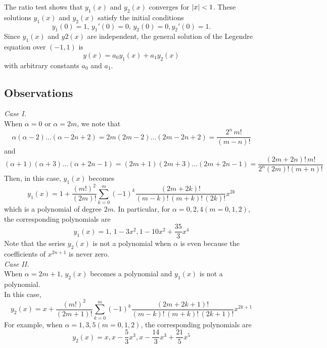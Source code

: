 \documentclass[../main-sheet.tex]{subfiles}
\begin{document}
\begin{note}
    The ratio test shows that $ y_1(x ) $ and $ y_2(x ) $ converges for $ \left\vert x\right\vert < 1 $. These solutions $ y_1(x ) $ and $ y_2(x ) $ satisfy the initial conditions
    \[
        y_1(0) = 1,\, y_1' (0) = 0, \,y_2(0) = 0, y_2' (0) = 1.
        \]
    Since $ y_1(x ) $ and $  y2(x ) $ are independent, the general solution of the Legendre equation over $ (-1, 1) $ is
    \[
        y (x ) = a_0y_1(x ) + a_1y_2(x ) 
    \]
    with arbitrary constants $ a_0 $ and $ a_1 $.
\end{note}
\subsection{Observations}
    \emph{Case I.}\\
    When $ \alpha = 0 $ or $ \alpha = 2m $, we note that
    \[
        \alpha(\alpha - 2)\dots(\alpha - 2n + 2) = 2m(2m - 2)\dots(2m - 2n + 2) = \frac{2^n\,m!}{(m - n)!}
    \]
    and
    \[
        (\alpha + 1)(\alpha + 3)\dots(\alpha + 2n - 1)   =   (2m + 1)(2m + 3)\dots(2m + 2n - 1)=\frac{(2m + 2n)!\,m!}{2^n (2m)!(m + n)!}
    \]
    Then, in this case, $ y_1(x ) $ becomes
    \[
        y_1(x ) = 1 +\frac{(m!)^2}{(2m)!}\sum_{k=0}^m (-1)^k\frac{(2m+2k)!}{(m-k)!\,(m+k)!\,(2k)!}x^{2k}
    \]
    which is a polynomial of degree $ 2m $. In particular, for $ \alpha = 0, 2, 4(m = 0, 1, 2) $, the corresponding polynomials are
    \[
        y_1 (x ) = 1,\,  1 - 3x^2  ,  1 - 10x^2+\frac{35}{3}x^4
    \]
    Note that the series $ y_2(x ) $ is not a polynomial when $ \alpha $ is even because the coefficients of $ x^{2n+1} $ is never zero.\\
    \emph{Case II.}\\
    When $ \alpha = 2m + 1,\, y_2(x ) $ becomes a polynomial and $ y_1(x ) $ is not a polynomial.\\
    In this case,
    \[
        y_2(x)=x+\frac{(m!)^2}{(2m+1)!}\sum_{k=0}^m (-1)^k\frac{(2m+2k+1)!}{(m-k)!\,(m+k)!\,(2k+1)!}x^{2k+1}
    \]
    For example, when $ \alpha = 1, 3, 5 (m = 0, 1, 2) $, the corresponding polynomials are
    \[
        y_2(x ) = x, x - \frac{5}{3}x^3, x -\frac{14}{3}x^3 +\frac{21}{5}x^5
    \]
\end{document}
